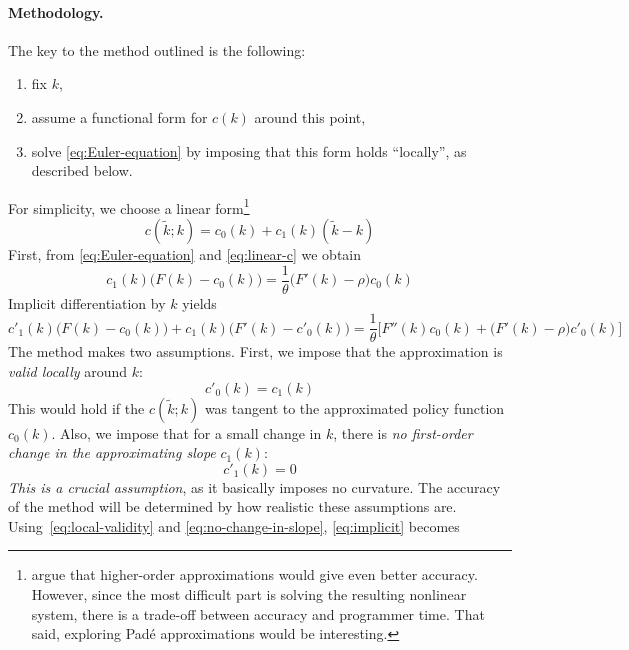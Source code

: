 \documentclass[a4paper,11pt]{article}
\newcommand{\tk}{\tilde{k}}
\begin{document}
\paragraph{Methodology.} The key to the method outlined is the following:
\begin{enumerate}
\item fix $k$,
\item assume a functional form for $c(k)$ around this point,
\item solve \eqref{eq:Euler-equation} by imposing that this form holds ``locally'', as described below.
\end{enumerate}
For simplicity, we choose a linear form\footnote{\textcite{den2015exact} argue that higher-order approximations would give even better accuracy. However, since the most difficult part is solving the resulting nonlinear system, there is a trade-off between accuracy and programmer time. That said, exploring Padé approximations would be interesting.}
\begin{equation}
  \label{eq:linear-c}
  c(\tk; k) = c_0(k) + c_1(k)(\tk-k)
\end{equation}
First, from \eqref{eq:Euler-equation} and \eqref{eq:linear-c} we obtain
\begin{equation}
  \label{eq:linear-Euler}
  c_1(k)\bigl( F(k) - c_0(k) \bigr) = \frac{1}{\theta}\bigl( F'(k) - \rho \bigr) c_0(k)
\end{equation}
Implicit differentiation by $k$ yields
\begin{equation}
  \label{eq:implicit}
  c'_1(k)\bigl( F(k) - c_0(k) \bigr) + c_1(k)\bigl( F'(k) - c'_0(k) \bigr) =
  \frac{1}{\theta}\biggl[ F''(k) c_0(k) + \bigl( F'(k) - \rho \bigr) c'_0(k) \biggr]
\end{equation}
The method makes two assumptions. First, we impose that the approximation is \emph{valid locally} around $k$:
\begin{equation}
  \label{eq:local-validity}
  c'_0(k) = c_1(k)
\end{equation}
This would hold if the $c(\tk;k)$ was tangent to the approximated policy function $c_0(k)$. Also, we impose that for a small change in $k$, there is \emph{no first-order change in the approximating slope} $c_1(k)$:
\begin{equation}
  \label{eq:no-change-in-slope}
  c'_1(k) = 0
\end{equation}
\emph{This is a crucial assumption}, as it basically imposes no curvature. The accuracy of the method will be determined by how realistic these assumptions are. Using~\eqref{eq:local-validity} and \eqref{eq:no-change-in-slope}, \eqref{eq:implicit} becomes
\end{document}

